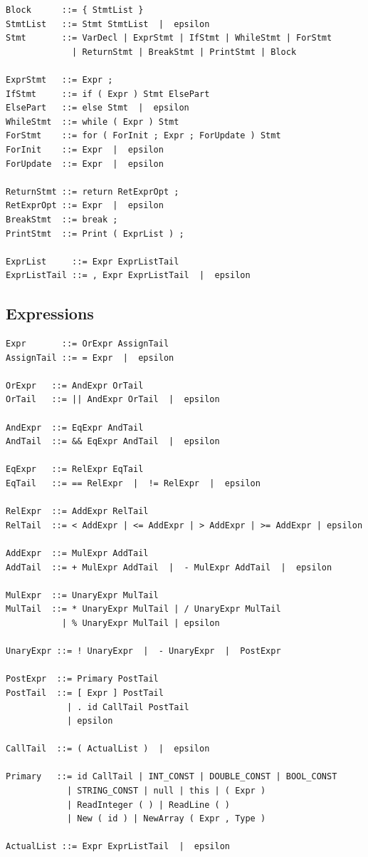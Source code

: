 \documentclass[12pt,a4paper]{article}
\begin{document}
\begin{lstlisting}[style=bnf]
Block      ::= { StmtList }
StmtList   ::= Stmt StmtList  |  epsilon
Stmt       ::= VarDecl | ExprStmt | IfStmt | WhileStmt | ForStmt
             | ReturnStmt | BreakStmt | PrintStmt | Block

ExprStmt   ::= Expr ;
IfStmt     ::= if ( Expr ) Stmt ElsePart
ElsePart   ::= else Stmt  |  epsilon
WhileStmt  ::= while ( Expr ) Stmt
ForStmt    ::= for ( ForInit ; Expr ; ForUpdate ) Stmt
ForInit    ::= Expr  |  epsilon
ForUpdate  ::= Expr  |  epsilon

ReturnStmt ::= return RetExprOpt ;
RetExprOpt ::= Expr  |  epsilon
BreakStmt  ::= break ;
PrintStmt  ::= Print ( ExprList ) ;

ExprList     ::= Expr ExprListTail
ExprListTail ::= , Expr ExprListTail  |  epsilon
\end{lstlisting}

\subsection{Expressions}

\begin{lstlisting}[style=bnf]
Expr       ::= OrExpr AssignTail
AssignTail ::= = Expr  |  epsilon

OrExpr   ::= AndExpr OrTail
OrTail   ::= || AndExpr OrTail  |  epsilon

AndExpr  ::= EqExpr AndTail
AndTail  ::= && EqExpr AndTail  |  epsilon

EqExpr   ::= RelExpr EqTail
EqTail   ::= == RelExpr  |  != RelExpr  |  epsilon

RelExpr  ::= AddExpr RelTail
RelTail  ::= < AddExpr | <= AddExpr | > AddExpr | >= AddExpr | epsilon

AddExpr  ::= MulExpr AddTail
AddTail  ::= + MulExpr AddTail  |  - MulExpr AddTail  |  epsilon

MulExpr  ::= UnaryExpr MulTail
MulTail  ::= * UnaryExpr MulTail | / UnaryExpr MulTail
           | % UnaryExpr MulTail | epsilon

UnaryExpr ::= ! UnaryExpr  |  - UnaryExpr  |  PostExpr

PostExpr  ::= Primary PostTail
PostTail  ::= [ Expr ] PostTail
            | . id CallTail PostTail
            | epsilon

CallTail  ::= ( ActualList )  |  epsilon

Primary   ::= id CallTail | INT_CONST | DOUBLE_CONST | BOOL_CONST
            | STRING_CONST | null | this | ( Expr )
            | ReadInteger ( ) | ReadLine ( )
            | New ( id ) | NewArray ( Expr , Type )

ActualList ::= Expr ExprListTail  |  epsilon
\end{lstlisting}
\end{document}
